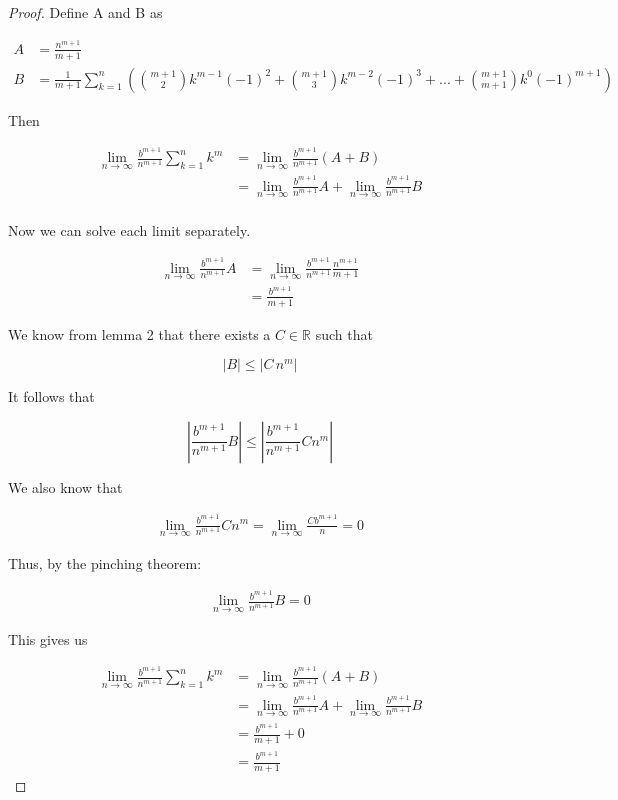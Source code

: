 \documentclass{article}
\begin{document}
\begin{proof}

Define A and B as 

\begin{align*}
A &= \displaystyle \frac{n^{m+1}}{m+1} \\
B &= \frac{1}{m+1} \displaystyle \sum_{k=1}^{n} \left( \binom{m+1}{2} k^{m-1} (-1)^2 +  \binom{m+1}{3} k^{m-2} (-1)^3 + ... +  \binom{m+1}{m+1} k^{0} (-1)^{m+1} \right) 
\end{align*}

Then

\begin{align*}
\lim_{n \to \infty} \frac{b^{m+1}}{n^{m+1}} \sum_{k=1}^{n} k^{m} &= \lim_{n \to \infty} \frac{b^{m+1}}{n^{m+1}} (A + B) \\
&= \lim_{n \to \infty} \frac{b^{m+1}}{n^{m+1}} A + \lim_{n \to \infty} \frac{b^{m+1}}{n^{m+1}} B \\
\end{align*}

Now we can solve each limit separately.

\begin{align*}
\lim_{n \to \infty} \frac{b^{m+1}}{n^{m+1}} A &=  \lim_{n \to \infty} \frac{b^{m+1}}{n^{m+1}} \frac{n^{m+1}}{m+1} \\
&=  \frac{b^{m+1}}{m+1} 
\end{align*}

We know from lemma 2 that there exists a $C \in \mathbb{R}$ such that 

\begin{equation*}
|B| \le |C \, n^{m}|
\end{equation*}

It follows that

\begin{equation*}
\left| \frac{b^{m+1}}{n^{m+1}} B \right| \le \left| \frac{b^{m+1}}{n^{m+1}} Cn^{m} \right|
\end{equation*}

We also know that

\begin{align*}
\lim_{n \to \infty} \frac{b^{m+1}}{n^{m+1}} C n^{m}  = \lim_{n \to \infty} \frac{C b^{m+1}}{n} = 0
\end{align*} 

Thus, by the pinching theorem:

\begin{align*}
\lim_{n \to \infty} \frac{b^{m+1}}{n^{m+1}} B = 0
\end{align*}

This gives us

\begin{align*}
\lim_{n \to \infty} \frac{b^{m+1}}{n^{m+1}} \sum_{k=1}^{n} k^{m} &= \lim_{n \to \infty} \frac{b^{m+1}}{n^{m+1}} (A + B) \\
&= \lim_{n \to \infty} \frac{b^{m+1}}{n^{m+1}} A + \lim_{n \to \infty} \frac{b^{m+1}}{n^{m+1}} B \\
&= \frac{b^{m+1}}{m+1} + 0 \\
&= \frac{b^{m+1}}{m+1} 
\end{align*}

\end{proof}
\end{document}
